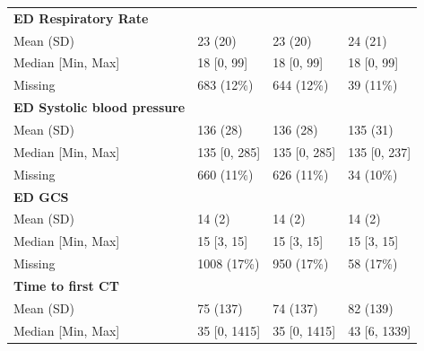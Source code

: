 \documentclass[12pt, letterpaper]{article}
\begin{document}
\begin{table}
{\begin{tabular}{llll}
            \textbf{ED Respiratory Rate}                  &                  &                 &               \\
            \hspace{3mm}Mean (SD)                         & 23 (20)          & 23 (20)         & 24 (21)       \\
            \hspace{3mm}Median [Min, Max]                 & 18 [0, 99]       & 18 [0, 99]      & 18 [0, 99]    \\
            \hspace{3mm}Missing                           & 683 (12\%)       & 644 (12\%)      & 39 (11\%)     \\
            \textbf{ED Systolic blood pressure}           &                  &                 &               \\
            \hspace{3mm}Mean (SD)                         & 136 (28)         & 136 (28)        & 135 (31)      \\
            \hspace{3mm}Median [Min, Max]                 & 135 [0, 285]     & 135 [0, 285]    & 135 [0, 237]  \\
            \hspace{3mm}Missing                           & 660 (11\%)       & 626 (11\%)      & 34 (10\%)     \\
            \textbf{ED GCS}                               &                  &                 &               \\
            \hspace{3mm}Mean (SD)                         & 14 (2)           & 14 (2)          & 14 (2)        \\
            \hspace{3mm}Median [Min, Max]                 & 15 [3, 15]       & 15 [3, 15]      & 15 [3, 15]    \\
            \hspace{3mm}Missing                           & 1008 (17\%)      & 950 (17\%)      & 58 (17\%)     \\
            \textbf{Time to first CT}                     &                  &                 &               \\
            \hspace{3mm}Mean (SD)                         & 75 (137)         & 74 (137)        & 82 (139)      \\
            \hspace{3mm}Median [Min, Max]                 & 35 [0, 1415]     & 35 [0, 1415]    & 43 [6, 1339]  \\

\end{tabular}}
\end{table}
\end{document}
